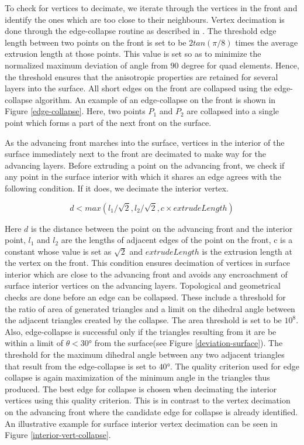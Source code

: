 \documentclass[conf]{new-aiaa}
\begin{document}
To check for vertices to decimate, we iterate through the vertices in the front and identify the ones which are too close to their neighbours. Vertex decimation is done through the edge-collapse routine as described in \cite{hoppe1994mesh}. The threshold edge length between two points on the front is set to be $2 tan(\pi/8)$ times the average extrusion length at those points. This value is set so as to minimize the normalized maximum deviation of angle from $90$ degree for quad elements. Hence, the threshold ensures that the anisotropic properties are retained for several layers into the surface. All short edges on the front are collapsed using the edge-collapse algorithm. An example of an edge-collapse on the front is shown in Figure \ref{edge-collapse}. Here, two points $P_1$ and $P_2$ are collapsed into a single point which forms a part of the next front on the surface.

As the advancing front marches into the surface, vertices in the interior of the surface immediately next to the front are decimated to make way for the advancing layers. Before extruding a point on the advancing front, we check if any point in the surface interior with which it shares an edge agrees with the following condition. If it does, we decimate the interior vertex.

\begin{equation}
    d < max(l_{1}/\sqrt{2}, l_{2}/\sqrt{2}, c\times extrudeLength)
    \label{collapse-eq}
\end{equation}

Here $d$ is the distance between the point on the advancing front and the interior point, $l_1$ and $l_2$ are the lengths of adjacent edges of the point on the front, c is a constant whose value is set as $\sqrt{2}$ and $extrudeLength$ is the extrusion length at the vertex on the front. This condition ensures decimation of vertices in surface interior which are close to the advancing front and avoids any encroachment of surface interior vertices on the advancing layers. Topological and geometrical checks are done before an edge can be collapsed. These include a threshold for the ratio of area of generated triangles and a limit on the dihedral angle between the adjacent triangles created by the collapse. The area threshold is set to be $10^8$. Also, edge-collapse is successful only if the triangles resulting from it are be within a limit of $\theta < \ang{30}$ from the surface(see Figure \ref{deviation-surface}). The threshold for the maximum dihedral angle between any two adjacent triangles that result from the edge-collapse is set to $\ang{40}$. The quality criterion used for edge collapse is again maximization of the minimum angle in the triangles thus produced. The best edge for collapse is chosen when decimating the interior vertices using this quality criterion. This is in contrast to the vertex decimation on the advancing front where the candidate edge for collapse is already identified. An illustrative example for surface interior vertex decimation can be seen in Figure \ref{interior-vert-collapse}.
\end{document}
